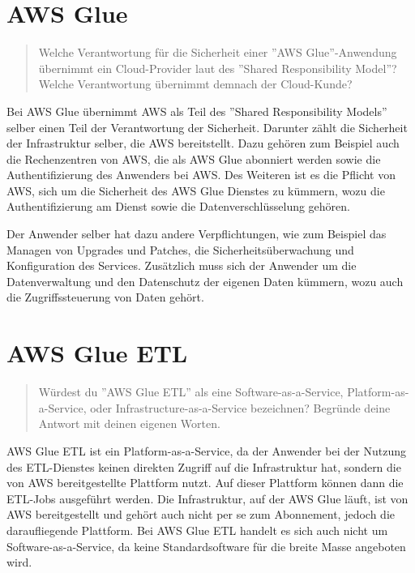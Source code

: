 \section{AWS Glue}
\begin{quote}
    Welche Verantwortung für die Sicherheit einer ''AWS Glue''-Anwendung übernimmt ein Cloud-Provider laut des ''Shared Responsibility Model''? Welche Verantwortung übernimmt demnach der Cloud-Kunde?
\end{quote}
Bei AWS Glue übernimmt AWS als Teil des ''Shared Responsibility Models'' selber einen Teil der Verantwortung der Sicherheit. Darunter zählt die Sicherheit der Infrastruktur selber, die AWS bereitstellt. Dazu gehören zum Beispiel auch die Rechenzentren von AWS, die als AWS Glue abonniert werden sowie die Authentifizierung des Anwenders bei AWS. Des Weiteren ist es die Pflicht von AWS, sich um die Sicherheit des AWS Glue Dienstes zu kümmern, wozu die Authentifizierung am Dienst sowie die Datenverschlüsselung gehören. 

Der Anwender selber hat dazu andere Verpflichtungen, wie zum Beispiel das Managen von Upgrades und Patches, die Sicherheitsüberwachung und Konfiguration des Services. Zusätzlich muss sich der Anwender um die Datenverwaltung und den Datenschutz der eigenen Daten kümmern, wozu auch die Zugriffssteuerung von Daten gehört. 

\section{AWS Glue ETL}
\begin{quote}
    Würdest du ''AWS Glue ETL'' als eine Software-as-a-Service, Platform-as-a-Service, oder Infrastructure-as-a-Service bezeichnen? Begründe deine Antwort mit deinen eigenen Worten.
\end{quote}
AWS Glue ETL ist ein Platform-as-a-Service, da der Anwender bei der Nutzung des ETL-Dienstes keinen direkten Zugriff auf die Infrastruktur hat, sondern die von AWS bereitgestellte Plattform nutzt. Auf dieser Plattform können dann die ETL-Jobs ausgeführt werden. Die Infrastruktur, auf der AWS Glue läuft, ist von AWS bereitgestellt und gehört auch nicht per se zum Abonnement, jedoch die daraufliegende Plattform. Bei AWS Glue ETL handelt es sich auch nicht um Software-as-a-Service, da keine Standardsoftware für die breite Masse angeboten wird. 